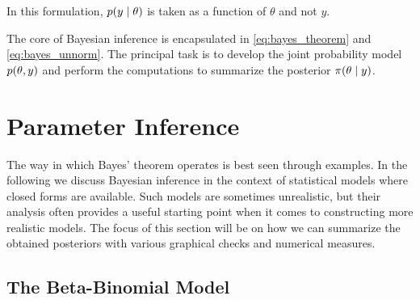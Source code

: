 In this formulation, $p \qty(y \mid \theta)$ is taken as a function of $\theta$ and not $y$.  

The core of Bayesian inference is encapsulated in \autoref{eq:bayes_theorem} and \autoref{eq:bayes_unnorm}. The principal task is to develop the joint probability model $p(\theta, y)$ and perform the computations to summarize the posterior $\pi \qty(\theta \mid y)$.


\section{Parameter Inference}\label{sec:param_inference}

The way in which Bayes' theorem operates is best seen through examples. In the following we discuss Bayesian inference in the context of statistical models where closed forms are available. Such models are sometimes unrealistic, but their analysis often provides a useful starting point when it comes to constructing more realistic models. The focus of this section will be on how we can summarize the obtained posteriors with various graphical checks and numerical measures. 


\subsection{The Beta-Binomial Model}\label{sec:coin_flipping}

